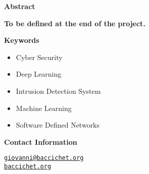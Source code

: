 \thispagestyle{empty}

{\bf\Huge Abstract}

\vspace{1cm}

\faEdit \quad \textbf{To be defined at the end of the project.} \\

\textcolor{dimgray}{\lipsum[1-3]}

\vspace{1cm}

{\bf\Huge Keywords}

\vspace{1cm}

\begin{itemize}
    \item[\faCaretRight] Cyber Security
    \item[\faCaretRight] Deep Learning
    \item[\faCaretRight] Intrusion Detection System
    \item[\faCaretRight] Machine Learning
    \item[\faCaretRight] Software Defined Networks
\end{itemize}

\vspace{1cm}

{\bf\Huge Contact Information}

\vspace{1cm}

\faEnvelope[regular] \quad \href{mailto:giovanni@baccichet.org}{\texttt{giovanni@baccichet.org}} \\

\faGlobeAmericas \quad\; \href{https://baccichet.org}{\texttt{baccichet.org}}



